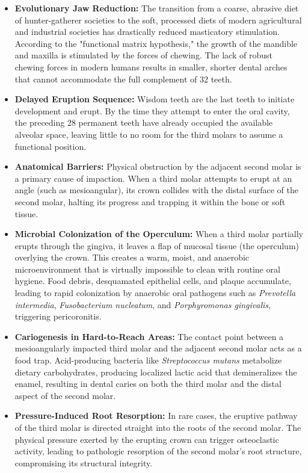\begin{itemize}
    \item \textbf{Evolutionary Jaw Reduction:} The transition from a coarse, abrasive diet of hunter-gatherer societies to the soft, processed diets of modern agricultural and industrial societies has drastically reduced masticatory stimulation. According to the "functional matrix hypothesis," the growth of the mandible and maxilla is stimulated by the forces of chewing. The lack of robust chewing forces in modern humans results in smaller, shorter dental arches that cannot accommodate the full complement of 32 teeth.
    \item \textbf{Delayed Eruption Sequence:} Wisdom teeth are the last teeth to initiate development and erupt. By the time they attempt to enter the oral cavity, the preceding 28 permanent teeth have already occupied the available alveolar space, leaving little to no room for the third molars to assume a functional position.
    \item \textbf{Anatomical Barriers:} Physical obstruction by the adjacent second molar is a primary cause of impaction. When a third molar attempts to erupt at an angle (such as mesioangular), its crown collides with the distal surface of the second molar, halting its progress and trapping it within the bone or soft tissue.
    \item \textbf{Microbial Colonization of the Operculum:} When a third molar partially erupts through the gingiva, it leaves a flap of mucosal tissue (the operculum) overlying the crown. This creates a warm, moist, and anaerobic microenvironment that is virtually impossible to clean with routine oral hygiene. Food debris, desquamated epithelial cells, and plaque accumulate, leading to rapid colonization by anaerobic oral pathogens such as \textit{Prevotella intermedia}, \textit{Fusobacterium nucleatum}, and \textit{Porphyromonas gingivalis}, triggering pericoronitis.
    \item \textbf{Cariogenesis in Hard-to-Reach Areas:} The contact point between a mesioangularly impacted third molar and the adjacent second molar acts as a food trap. Acid-producing bacteria like \textit{Streptococcus mutans} metabolize dietary carbohydrates, producing localized lactic acid that demineralizes the enamel, resulting in dental caries on both the third molar and the distal aspect of the second molar.
    \item \textbf{Pressure-Induced Root Resorption:} In rare cases, the eruptive pathway of the third molar is directed straight into the roots of the second molar. The physical pressure exerted by the erupting crown can trigger osteoclastic activity, leading to pathologic resorption of the second molar's root structure, compromising its structural integrity.

\end{itemize}
